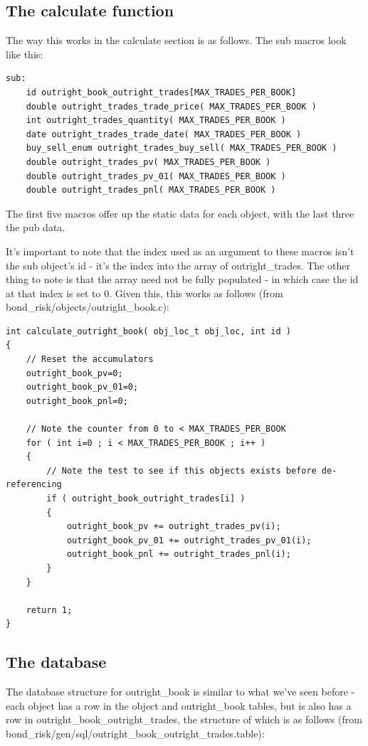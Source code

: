 \documentclass{report}
\begin{document}
\subsection{The calculate function}

The way this works in the calculate section is as follows. The sub macros look like this:

\begin{verbatim}
sub:
    id outright_book_outright_trades[MAX_TRADES_PER_BOOK]
    double outright_trades_trade_price( MAX_TRADES_PER_BOOK )
    int outright_trades_quantity( MAX_TRADES_PER_BOOK )
    date outright_trades_trade_date( MAX_TRADES_PER_BOOK )
    buy_sell_enum outright_trades_buy_sell( MAX_TRADES_PER_BOOK )
    double outright_trades_pv( MAX_TRADES_PER_BOOK )
    double outright_trades_pv_01( MAX_TRADES_PER_BOOK )
    double outright_trades_pnl( MAX_TRADES_PER_BOOK )
\end{verbatim}

The first five macros offer up the static data for each object, with the last three the pub data.

It's important to note that the index used as an argument to these macros isn't the sub object's id - it's the index into the array of outright_trades. The other thing to note is that the array need not be fully populated - in which case the id at that index is set to 0. Given this, this works as follows (from bond_risk/objects/outright_book.c):

\begin{verbatim}
int calculate_outright_book( obj_loc_t obj_loc, int id )
{
    // Reset the accumulators
    outright_book_pv=0;
    outright_book_pv_01=0;
    outright_book_pnl=0;

    // Note the counter from 0 to < MAX_TRADES_PER_BOOK
    for ( int i=0 ; i < MAX_TRADES_PER_BOOK ; i++ )
    {
        // Note the test to see if this objects exists before de-referencing
        if ( outright_book_outright_trades[i] )
        {
            outright_book_pv += outright_trades_pv(i);
            outright_book_pv_01 += outright_trades_pv_01(i);
            outright_book_pnl += outright_trades_pnl(i);
        }
    }

    return 1;
}
\end{verbatim}

\subsection{The database}

The database structure for outright_book is similar to what we've seen before - each object has a row in the object and outright_book tables, but is also has a row in outright_book_outright_trades, the structure of which is as follows (from bond_risk/gen/sql/outright_book_outright_trades.table):
\end{document}
